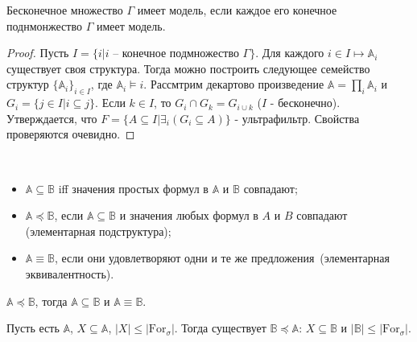 \begin{theorem}
    Бесконечное множество $\Gamma$ имеет модель, если каждое его конечное поднмонжество $\Gamma$ имеет модель.
\end{theorem}  

\begin{proof}
    Пусть $I = \{i | i \text{ -- конечное подмножество } \Gamma\}$. Для каждого $i \in I \mapsto \mathbb{A}_i$ существует своя структура. Тогда можно построить следующее семейство структур $\{\mathbb{A}_i\}_{i \in I}$, где $\mathbb{A}_i \models i$. Рассмтрим декартово произведение $\mathbb{A} = \prod_i \mathbb{A}_i$ и $G_i = \{j \in I | i \subseteq j\}$. Если $k \in I$, то $G_i \cap G_k = G_{i \cup k}$ ($I$ - бесконечно). Утверждается, что $F = \{A \subseteq I | \exists_i (G_i \subseteq A)\}$ - ультрафильтр. Свойства проверяются очевидно. 
\end{proof}

\begin{definition} \ 
    
    \begin{itemize}
        \item $\mathbb{A} \subseteq \mathbb{B}$ iff значения простых формул в $\mathbb{A}$ и $\mathbb{B}$ совпадают; 
        \item $\mathbb{A} \preceq \mathbb{B}$, если $\mathbb{A} \subseteq \mathbb{B}$ и значения любых формул в $A$ и $B$ совпадают (элементарная подструктура); 
        \item $\mathbb{A} \equiv \mathbb{B}$, если они удовлетворяют одни и те же предложения (элементарная эквивалентность).
    \end{itemize}
\end{definition}

\begin{stat}
    $\mathbb{A} \preceq \mathbb{B}$, тогда $\mathbb{A} \subseteq \mathbb{B}$ и $\mathbb{A} \equiv \mathbb{B}$. 
\end{stat}

\begin{theorem}
    Пусть есть $\mathbb{A}$, $X \subseteq \mathbb{A}$, $|X| \leq |\text{For}_\sigma|$. Тогда существует $\mathbb{B} \preceq \mathbb{A}$: $X \subseteq \mathbb{B}$ и $|\mathbb{B}| \leq |\text{For}_\sigma|$. 
\end{theorem}